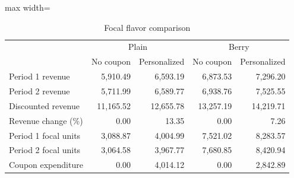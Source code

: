 \begin{table}[htbp]\centering\small
\caption{Focal flavor comparison}
\label{tab:focal-flavor-comparison}
\begin{adjustbox}{max width=\linewidth}
\begin{tabular}{lrrrr}\toprule
 & \multicolumn{2}{c}{Plain} & \multicolumn{2}{c}{Berry}\\
 & No coupon & Personalized & No coupon & Personalized\\\midrule
Period 1 revenue & 5,910.49 & 6,593.19 & 6,873.53 & 7,296.20 \\
Period 2 revenue & 5,711.99 & 6,589.77 & 6,938.76 & 7,525.55 \\
Discounted revenue & 11,165.52 & 12,655.78 & 13,257.19 & 14,219.71 \\
Revenue change (\%) & 0.00 & 13.35 & 0.00 & 7.26 \\
Period 1 focal units & 3,088.87 & 4,004.99 & 7,521.02 & 8,283.57 \\
Period 2 focal units & 3,064.58 & 3,967.77 & 7,680.85 & 8,420.94 \\
Coupon expenditure & 0.00 & 4,014.12 & 0.00 & 2,842.89 \\
\bottomrule\end{tabular}
\end{adjustbox}
\end{table}
